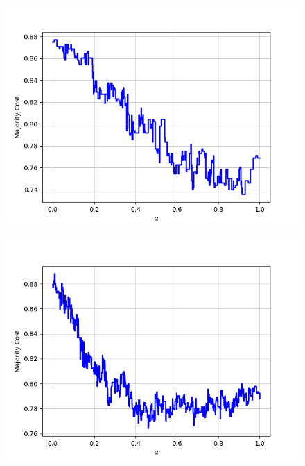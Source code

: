 \begin{figure}[h]
\begin{minipage}{.19\textwidth}
  {\includegraphics[width=\linewidth]{plots/omniglot-intra-ac/Asomtavruli_(Georgian)}}
\end{minipage}
\begin{minipage}{.19\textwidth}
  \centering
  {\includegraphics[width=\linewidth]{plots/omniglot-intra-ac/Balinese}}
\end{minipage}
\begin{minipage}{.19\textwidth}
  \centering

\end{minipage}
\end{figure}
